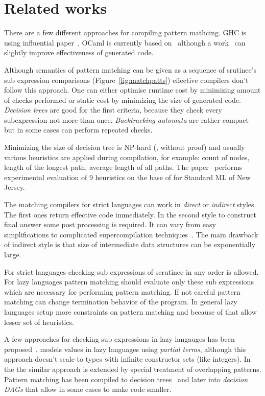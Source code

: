 \section{Related works}
\label{sec:related}

There are a few different approaches for compiling pattern mathcing. GHC is using influential paper~\cite{Jones1987}, OCaml is currently based on~\cite{maranget2001} although a work~\cite{maranget2008} can slightly improve effectiveness of generated code. 

Although semantics of pattern matching can be given as a sequence of srutinee's sub expression comparisons (Figure~\ref{fig:matchpatts}) effective compilers don't follow this approach. One can either optimise runtime cost by minimizing amount of checks performed or static cost by minimizing the size of generated code. \emph{Decision trees} are good for the first criteria, because they check every subexpression not more than once. \emph{Backtracking automata} are rather compact but in some cases can perform repeated checks.


Minimizing the size of decision tree is  NP-hard (\cite{baudinet1985tree}, without proof) and usually various heuristics are applied during compilation, for example: count of nodes, length of the longest path, average length of all paths. The paper~\cite{Scott2000WhenDM} performs experimental evaluation of 9  heuristics on the base of for Standard ML of New Jersey.


The matching compilers for strict languages can work in \emph{direct} or \emph{indirect} styles. The first ones return effective code immediately. In the second style to construct final answer some post processing is required. It can vary from easy simplifications to complicated supercompilation techniques~\cite{sestoft1996}. The main drawback of indirect style is that size of intermediate data structures can be exponentially large.

For strict languages checking  sub expressions of scrutinee in any order is allowed. For lazy languages pattern matching should evaluate only these sub expressions which are necessary for performing pattern matching. If not careful pattern matching can change termination behavior of the program.  In general lazy languages setup more constraints on pattern matching and because of that allow lesser set of heuristics.

A few approaches for checking sub expressions in lazy langauges has been proposed~\cite{augustsson1985,laville1991}. \cite{laville1991} models values in lazy languages using \emph{partial terms}, although this approach doesn't scale to types with infinite constructor sets (like integers). In  the \cite{suarez1993} the similar approach is extended by special treatment of overlapping patterns. Pattern matching has been compiled to decision trees~\cite{maranget1992} and later \cite{maranget1992} into \emph{decision DAGs} that allow in some cases to make code smaller.

